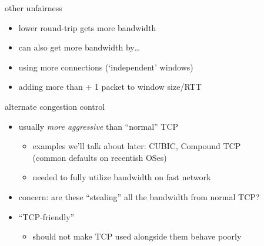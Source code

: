 \begin{frame}{other unfairness}
    \begin{itemize}
    \item lower round-trip gets more bandwidth
    \item can also get more bandwidth by\ldots
    \vspace{.5cm}
    \item using more connections (`independent' windows)
    \item adding more than + 1 packet to window size/RTT
    \end{itemize}
\end{frame}

\begin{frame}{alternate congestion control}
    \begin{itemize}
    \item usually \textit{more aggressive} than ``normal'' TCP
        \begin{itemize}
        \item examples we'll talk about later: CUBIC, Compound TCP \\
            (common defaults on recentish OSes)
        \item needed to fully utilize bandwidth on fast network
        \end{itemize}
    \vspace{.5cm}
    \item concern: are these ``stealing'' all the bandwidth from normal TCP?
    \item ``TCP-friendly''
        \begin{itemize}
        \item should not make TCP used alongside them behave poorly
        \end{itemize}
    \end{itemize}
\end{frame}

